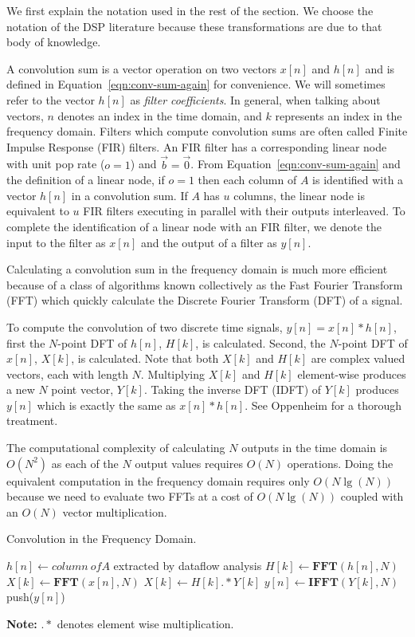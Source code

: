 We first explain the notation used in the rest of the section. 
We choose the notation of the DSP literature because
these transformations are due to that body of knowledge.

A convolution sum is a vector operation on two vectors $x[n]$ and 
$h[n]$ and is defined in Equation~\ref{eqn:conv-sum-again} for
convenience. We will sometimes refer to the vector $h[n]$ as 
{\it filter coefficients}. In general, when talking about vectors, $n$ denotes 
an index in the time domain, and $k$ represents an index in the 
frequency domain. Filters which compute convolution sums are often called 
Finite Impulse Response (FIR) filters. An FIR filter has a corresponding linear 
node with unit pop rate ($o=1$) and ${\vec b} = {\vec 0}$. From 
Equation~\ref{eqn:conv-sum-again} and the definition of a linear node,
if $o=1$ then each column of $A$ is identified with a vector $h[n]$
in a convolution sum. If $A$ has $u$ columns,	
the linear node is equivalent to $u$ FIR filters 
executing in parallel with their outputs interleaved.
To complete the identification of a linear node with an FIR filter,
we denote the input to the filter as $x[n]$ and the output of
a filter as $y[n]$.

Calculating a convolution sum in the frequency domain is much
more efficient because of a class of algorithms known collectively as 
the Fast Fourier Transform (FFT) which quickly calculate 
the Discrete Fourier Transform (DFT) of a signal.

To compute the convolution of two discrete time signals, $y[n]=x[n]*h[n]$,
first the $N$-point DFT of $h[n]$, $H[k]$, is calculated.
Second, the $N$-point DFT of $x[n]$, $X[k]$, is calculated.
Note that both $X[k]$ and $H[k]$ are complex valued vectors, each with 
length $N$. Multiplying $X[k]$ and $H[k]$ element-wise produces a new $N$ point
vector, $Y[k]$. Taking the inverse DFT (IDFT) of $Y[k]$ produces 
$y[n]$ which is exactly the same as $x[n]*h[n]$. See Oppenheim
\cite{oppenheim-discrete} for a thorough treatment.

The computational complexity of calculating $N$ outputs in the time domain
is $O(N^2)$ as each of the $N$ output values requires $O(N)$ operations.
Doing the equivalent computation in the frequency domain requires
only $O(N \lg(N))$ because we need to evaluate two FFTs at a cost of
$O(N \lg(N))$ coupled with an $O(N)$ vector multiplication.

\begin{algorithm}
  \caption{Convolution in the Frequency Domain.\label{alg:freq-overview}}
  \begin{algorithmic}
    \STATE $h[n] \leftarrow {\mathit column~of}A$ extracted by dataflow analysis
    \STATE $H[k] \leftarrow \mathbf{FFT}(h[n],N)$ 
      \STATE $X[k] \leftarrow \mathbf{FFT}(x[n],N)$
      \STATE $X[k] \leftarrow H[k] .* Y[k]$ 
      \STATE $y[n] \leftarrow \mathbf{IFFT}(Y[k],N)$
      \STATE push($y[n]$)
    \ENDWHILE
  \end{algorithmic}
  {\bf Note:} $.*$ denotes element wise multiplication.
\end{algorithm}

